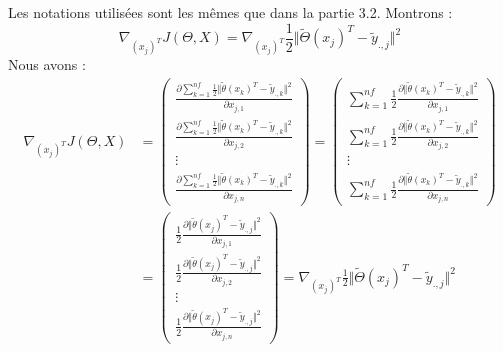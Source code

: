\documentclass[a4paper,10pt]{article}
\begin{document}
\subsection{}  
\label{P1}
Les notations utilisées sont les mêmes que dans la partie 3.2. Montrons : \[\nabla_{(x_{j})^T} J(\Theta, X) = \nabla_{(x_{j})^T}\frac{1}{2}\Vert\tilde{\Theta}(x_{j})^{T}-\tilde{y}_{.,j}\Vert^{2}\]
Nous avons :
\begin{align*}
\nabla_{(x_{j})^T} J(\Theta, X) &=  
\begin{pmatrix}  
\displaystyle\frac{\partial \displaystyle\sum_{k=1}^{nf}\frac{1}{2}\Vert\tilde{\theta}(x_{k})^{T}-\tilde{y}_{.,k}\Vert^{2}}{\partial x_{j,1}}\\  
\displaystyle\frac{\partial \displaystyle\sum_{k=1}^{nf}\frac{1}{2}\Vert\tilde{\theta}(x_{k})^{T}-\tilde{y}_{.,k}\Vert^{2}}{\partial x_{j,2}}\\  
\vdots\\  
\displaystyle\frac{\partial \displaystyle\sum_{k=1}^{nf}\frac{1}{2}\Vert\tilde{\theta}(x_{k})^{T}-\tilde{y}_{.,k}\Vert^{2}}{\partial x_{j,n}}  
\end{pmatrix}  
=  
\begin{pmatrix}  
\displaystyle\sum_{k=1}^{nf}  
\frac{1}{2}\frac{\partial\Vert\tilde{\theta}(x_{k})^{T}-\tilde{y}_{.,k}\Vert^{2}}{\partial x_{j,1}}\\  
\displaystyle\sum_{k=1}^{nf}  
\frac{1}{2}\frac{\partial\Vert\tilde{\theta}(x_{k})^{T}-\tilde{y}_{.,k}\Vert^{2}}{\partial x_{j,2}}\\  
\vdots\\  
\displaystyle\sum_{k=1}^{nf}  
\frac{1}{2}\frac{\partial\Vert\tilde{\theta}(x_{k})^{T}-\tilde{y}_{.,k}\Vert^{2}}{\partial x_{j,n}}  
\end{pmatrix}\\
&=  
\begin{pmatrix}  
\displaystyle  
\frac{1}{2}\frac{\partial\Vert\tilde{\theta}(x_{j})^{T}-\tilde{y}_{.,j}\Vert^{2}}{\partial x_{j,1}}\\  
\displaystyle  
\frac{1}{2}\frac{\partial\Vert\tilde{\theta}(x_{j})^{T}-\tilde{y}_{.,j}\Vert^{2}}{\partial x_{j,2}}\\  
\vdots\\  
\displaystyle  
\frac{1}{2}\frac{\partial\Vert\tilde{\theta}(x_{j})^{T}-\tilde{y}_{.,j}\Vert^{2}}{\partial x_{j,n}}  
\end{pmatrix}
=  
\displaystyle  
\nabla_{(x_{j})^T}\frac{1}{2}\Vert\tilde{\Theta}(x_{j})^{T}-\tilde{y}_{.,j}\Vert^{2}
\end{align*}\\
\end{document}
